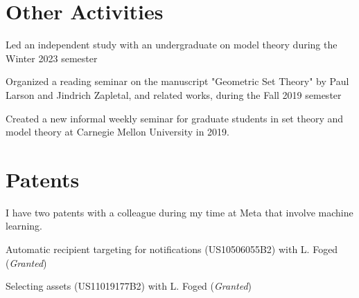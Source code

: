 \documentclass[letterpaper]{article}
\renewenvironment{itemize}{
  \begin{list}{}{
    \setlength{\leftmargin}{1.5em}
  }
}{
  \end{list}
}
\begin{document}
\section*{Other Activities}

\begin{itemize}
    \item Led an independent study with an undergraduate on model theory during the Winter 2023 semester
    \item Organized a reading seminar on the manuscript "Geometric Set Theory" by Paul Larson and Jindrich Zapletal, and related works, during the Fall 2019 semester
    \item Created a new informal weekly seminar for graduate students in set theory and model theory at Carnegie Mellon University in 2019.
\end{itemize}

\section*{Patents}

I have two patents with a colleague during my time at Meta that involve machine learning.

\begin{itemize}
    \item Automatic recipient targeting for notifications (US10506055B2) with L. Foged (\emph{Granted})
    \item Selecting assets (US11019177B2) with L. Foged (\emph{Granted})
\end{itemize}



\end{document}
